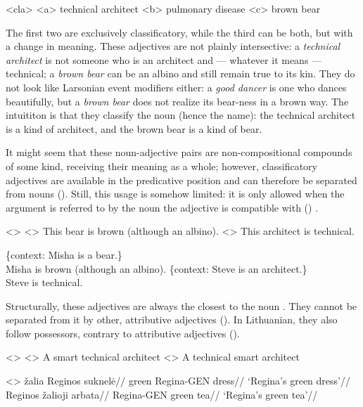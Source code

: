\documentclass[a4paper, 12pt]{article}
\begin{document}
\pex<cla>
    \a<a> technical architect
    \a<b> pulmonary disease
    \a<c> brown bear
\xe

The first two are exclusively classificatory, while the third can be both, but with a change in meaning. These adjectives are not plainly intersective: a \textit{technical architect} is not someone who is an architect and --- whatever it means --- technical; a \textit{brown bear} can be an albino and still remain true to its kin. They do not look like Larsonian event modifiers either: a \textit{good dancer} is one who dances beautifully, but a \textit{brown bear} does not realize its bear-ness in a brown way. The intuititon is that they classify the noun (hence the name): the technical architect is a kind of architect, and the brown bear is a kind of bear.

It might seem that these noun-adjective pairs are non-compositional compounds of some kind, receiving their meaning as a whole; however, classificatory adjectives are available in the predicative position and can therefore be separated from nouns (\nextx). Still, this usage is somehow limited: it is only allowed when the argument is referred to by the noun the adjective is compatible with (\anextx) \parencite[cf.][a.m.o.]{levi1978syntaxsemanticscomplex}.

\pex<>
    \a<> This bear is brown (although an albino).
    \a<> This architect is technical.
\xe

\pex
    \a \{context: Misha is a bear.\}\\ \ljudge{\textsuperscript{\#}}Misha is brown (although an albino).
    \a \{context: Steve is an architect.\}\\ \ljudge*Steve is technical.
\xe

Structurally, these adjectives are always the closest to the noun \parencite{rutkowski2006classifyingadjectivesnoun}. They cannot be separated from it by other, attributive adjectives (\nextx). In Lithuanian, they also follow possessors, contrary to attributive adjectives (\anextx).

\pex<>
    \a<> A smart technical architect
    \a<> \ljudge{*}A technical smart architect
\xe

\pex<>
    \a \begingl
        \gla žalia Reginos suknelė//
        \glb green Regina-GEN dress//
        \glft `Regina’s green dress’//
    \endgl
    \a \begingl
        \gla Reginos žalioji arbata//
        \glb Regina-GEN green tea//
        \glft `Regina’s green tea’//
    \endgl
\xe
\end{document}
